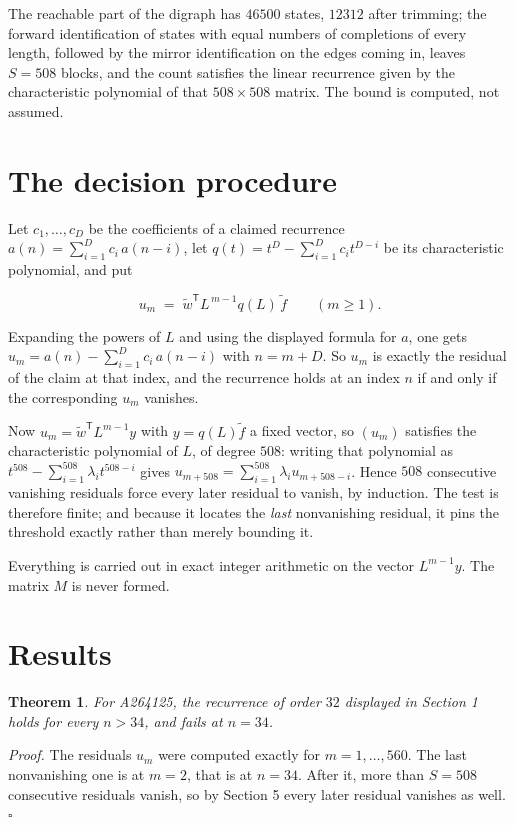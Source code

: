 \documentclass[11pt]{article}
\newtheorem{theorem}{Theorem}
\theoremstyle{definition}
\begin{document}
The reachable part of the digraph has $46500$ states, $12312$ after trimming; the forward identification of states with equal numbers of completions of every length, followed by the mirror identification on the edges coming in, leaves $S = 508$ blocks, and the count satisfies the linear recurrence given by the characteristic polynomial of that $508\times508$ matrix. The bound is computed, not assumed.

\section{The decision procedure}

Let $c_1,\dots,c_D$ be the coefficients of a claimed recurrence $a(n) = \sum_{i=1}^{D} c_i\,a(n-i)$, let $q(t) = t^{D} - \sum_{i=1}^{D} c_i t^{D-i}$ be its characteristic polynomial, and put

\[u_m \;=\; \tilde w^{\mathsf T} L^{\,m-1} q(L)\,\tilde f \qquad (m \ge 1).\]

Expanding the powers of $L$ and using the displayed formula for $a$, one gets $u_m = a(n) - \sum_{i=1}^{D} c_i\,a(n-i)$ with $n = m + D$. So $u_m$ is exactly the residual of the claim at that index, and the recurrence holds at an index $n$ if and only if the corresponding $u_m$ vanishes.

Now $u_m = \tilde w^{\mathsf T} L^{m-1} y$ with $y = q(L)\tilde f$ a fixed vector, so $(u_m)$ satisfies the characteristic polynomial of $L$, of degree $508$: writing that polynomial as $t^{508} - \sum_{i=1}^{508} \lambda_i t^{508-i}$ gives $u_{m+508} = \sum_{i=1}^{508} \lambda_i u_{m+508-i}$. Hence $508$ consecutive vanishing residuals force every later residual to vanish, by induction. The test is therefore finite; and because it locates the {\itshape last} nonvanishing residual, it pins the threshold exactly rather than merely bounding it.

Everything is carried out in exact integer arithmetic on the vector $L^{m-1}y$. The matrix $M$ is never formed.

\section{Results}

\begin{theorem} For A264125, the recurrence of order $32$ displayed in Section 1 holds for every $n > 34$, and fails at $n = 34$.\end{theorem}

{\itshape Proof.} The residuals $u_m$ were computed exactly for $m = 1,\dots,560$. The last nonvanishing one is at $m = 2$, that is at $n = 34$. After it, more than $S = 508$ consecutive residuals vanish, so by Section 5 every later residual vanishes as well. $\square$
\end{document}
